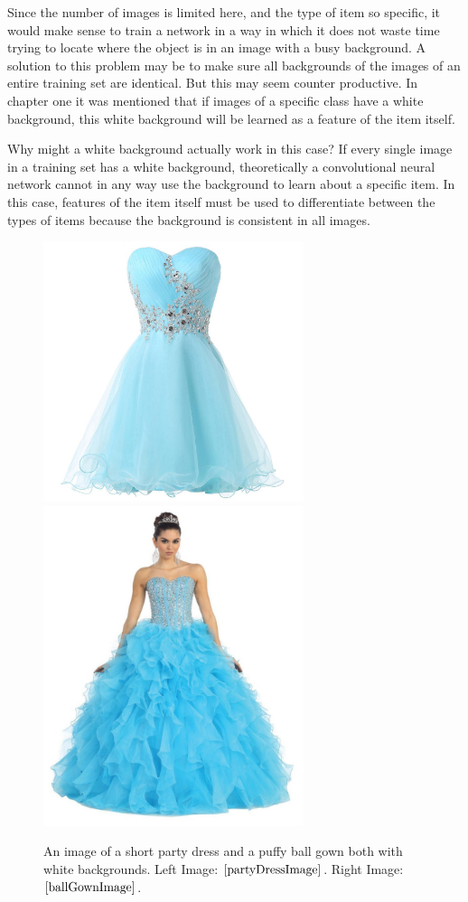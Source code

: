 \documentclass[12pt]{report} %
\begin{document}
	Since the number of images is limited here, and the type of item so specific, it would make sense to train a network in a way in which it does not waste time trying to locate where the object is in an image with a busy background. A solution to this problem may be to make sure all backgrounds of the images of an entire training set are identical. But this may seem counter productive. In chapter one it was mentioned that if images of a specific class have a white background, this white background will be learned as a feature of the item itself.
	
	Why might a white background actually work in this case? If every single image in a training set has a white background, theoretically a convolutional neural network cannot in any way use the background to learn about a specific item. In this case, features of the item itself must be used to differentiate between the types of items because the background is consistent in all images.
\begin{figure}
\centering
\includegraphics[width=3in]{short_party_dress}
\includegraphics[width=3in]{ball_gown}
\caption{An image of a short party dress and a puffy ball gown both with white backgrounds. Left Image: $\cite{partyDressImage}$. Right Image:  $\cite{ballGownImage}$.}
\end{figure}		
\end{document}
